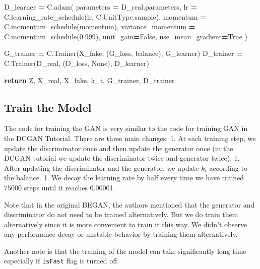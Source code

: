 \documentclass[]{book}
\newenvironment{Shaded}{\begin{snugshade}}{\end{snugshade}}
\newcommand{\FloatTok}[1]{\textcolor[rgb]{0.00,0.00,0.81}{#1}}
\newcommand{\VariableTok}[1]{\textcolor[rgb]{0.00,0.00,0.00}{#1}}
\newcommand{\ControlFlowTok}[1]{\textcolor[rgb]{0.13,0.29,0.53}{\textbf{#1}}}
\newcommand{\OperatorTok}[1]{\textcolor[rgb]{0.81,0.36,0.00}{\textbf{#1}}}
\newcommand{\NormalTok}[1]{#1}
\theoremstyle{definition}
\theoremstyle{definition}
\theoremstyle{definition}
\theoremstyle{remark}
\begin{document}
\begin{Shaded}
\begin{Highlighting}[]
\NormalTok{    D_learner }\OperatorTok{=}\NormalTok{ C.adam(}
\NormalTok{            parameters }\OperatorTok{=}\NormalTok{ D_real.parameters,}
\NormalTok{            lr }\OperatorTok{=}\NormalTok{ C.learning_rate_schedule(lr, C.UnitType.sample),}
\NormalTok{            momentum }\OperatorTok{=}\NormalTok{ C.momentum_schedule(momentum),}
\NormalTok{            variance_momentum }\OperatorTok{=}\NormalTok{ C.momentum_schedule(}\FloatTok{0.999}\NormalTok{), }
\NormalTok{            unit_gain}\OperatorTok{=}\VariableTok{False}\NormalTok{,}
\NormalTok{            use_mean_gradient}\OperatorTok{=}\VariableTok{True}
\NormalTok{    )}
    
\NormalTok{    G_trainer }\OperatorTok{=}\NormalTok{ C.Trainer(X_fake,}
\NormalTok{                        (G_loss, balance),}
\NormalTok{                        G_learner)}
\NormalTok{    D_trainer }\OperatorTok{=}\NormalTok{ C.Trainer(D_real,}
\NormalTok{                        (D_loss, }\VariableTok{None}\NormalTok{),}
\NormalTok{                        D_learner)}
    
    \ControlFlowTok{return}\NormalTok{ Z, X_real, X_fake, k_t, G_trainer, D_trainer}
\end{Highlighting}
\end{Shaded}

\subsection{Train the Model}\label{train-the-model-2}

The code for training the GAN is very similar to the code for training
GAN in the DCGAN Tutorial. There are three main changes: 1. At each
training step, we update the discriminator once and then update the
generator once (in the DCGAN tutorial we update the discriminator twice
and generator twice). 1. After updating the discriminator and the
generator, we update \(k_t\) according to the balance. 1. We decay the
learning rate by half every time we have trained 75000 steps until it
reaches 0.00001.

Note that in the original BEGAN, the authors mentioned that the
generator and discriminator do not need to be trained alternatively. But
we do train them alternatively since it is more convenient to train it
this way. We didn't observe any performance decay or unstable behavior
by training them alternatively.

Another note is that the training of the model can take significantly
long time especially if \texttt{isFast} flag is turned off.
\end{document}
